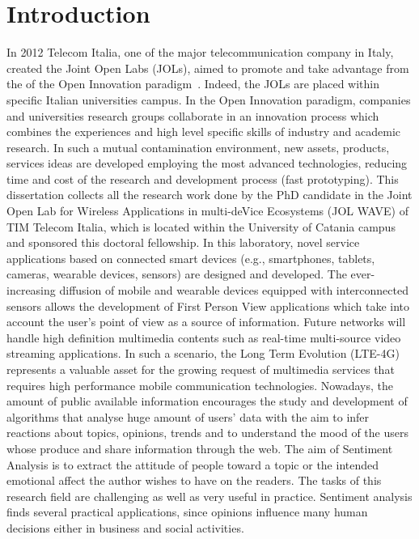 \chapter{Introduction}
In 2012 Telecom Italia, one of the major telecommunication company in Italy, created the Joint Open Labs (JOLs), aimed to promote and take advantage from the of the Open Innovation paradigm~\cite{chesbrough2006open}. Indeed, the JOLs are placed within specific Italian universities campus. In the Open Innovation paradigm, companies and universities research groups collaborate in an innovation process which combines the experiences and high level specific skills of industry and academic research.
In such a mutual contamination environment, new assets, products, services ideas are developed employing the most advanced
technologies, reducing time and cost of the research and development process (fast prototyping).
This dissertation collects all the research work done by the PhD candidate in the Joint Open Lab for Wireless Applications in multi-deVice Ecosystems (JOL WAVE) of TIM Telecom Italia, which is located within the University of Catania campus and sponsored this doctoral fellowship. In this laboratory, novel service applications based on connected smart devices (e.g., smartphones, tablets, cameras, wearable devices, sensors) are designed and developed.
The ever-increasing diffusion of mobile and wearable devices equipped with interconnected sensors allows the development of First Person View applications which take into account the user's point of view as a source of information.
Future networks will handle high definition multimedia contents such as real-time multi-source video streaming applications. In such a scenario, the Long Term Evolution (LTE-4G)~\cite{sesia2011lte} represents a valuable asset for the growing request of multimedia services that requires high performance mobile communication technologies.
Nowadays, the amount of public available information encourages the study and development of algorithms that analyse huge amount of users' data with the aim to infer reactions about topics, opinions, trends and to understand the mood of the users whose produce and share information through the web. The aim of Sentiment Analysis is to extract the attitude of people toward a topic or the intended emotional affect the author wishes to have on the readers. The tasks of this research field are challenging as well as very useful in practice. Sentiment analysis finds several practical applications, since opinions influence many human decisions either in business and social activities.  

